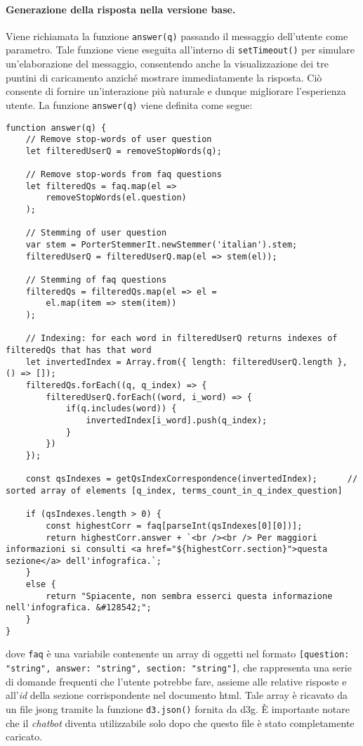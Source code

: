 \paragraph{Generazione della risposta nella versione base.} Viene richiamata la funzione \texttt{answer(q)} passando il messaggio dell'utente come parametro. Tale funzione viene eseguita all'interno di \texttt{setTimeout()} per simulare un'elaborazione 
del messaggio, consentendo anche la visualizzazione dei tre puntini di caricamento anziché mostrare immediatamente la risposta. Ciò consente di fornire un'interazione più naturale e dunque migliorare l'esperienza utente.
La funzione \texttt{answer(q)} viene definita come segue:
\begin{lstlisting}[style=htmlcssjs]
function answer(q) {   
    // Remove stop-words of user question
    let filteredUserQ = removeStopWords(q);

    // Remove stop-words from faq questions
    let filteredQs = faq.map(el => 
        removeStopWords(el.question)
    );

    // Stemming of user question
    var stem = PorterStemmerIt.newStemmer('italian').stem;
    filteredUserQ = filteredUserQ.map(el => stem(el));

    // Stemming of faq questions
    filteredQs = filteredQs.map(el => el =
        el.map(item => stem(item))
    );

    // Indexing: for each word in filteredUserQ returns indexes of filteredQs that has that word
    let invertedIndex = Array.from({ length: filteredUserQ.length }, () => []);
    filteredQs.forEach((q, q_index) => {
        filteredUserQ.forEach((word, i_word) => {
            if(q.includes(word)) {
                invertedIndex[i_word].push(q_index);
            }
        })
    });

    const qsIndexes = getQsIndexCorrespondence(invertedIndex);      // sorted array of elements [q_index, terms_count_in_q_index_question]

    if (qsIndexes.length > 0) {
        const highestCorr = faq[parseInt(qsIndexes[0][0])];
        return highestCorr.answer + `<br /><br /> Per maggiori informazioni si consulti <a href="${highestCorr.section}">questa sezione</a> dell'infografica.`;
    }
    else {
        return "Spiacente, non sembra esserci questa informazione nell'infografica. &#128542;";
    }
}
\end{lstlisting}
dove \texttt{faq} è una variabile contenente un array di oggetti nel formato \texttt{[{question: "string", answer: "string", section: "string"}]}, che rappresenta una serie di domande frequenti che l'utente potrebbe fare, 
assieme alle relative risposte e all'\emph{id} della sezione corrispondente nel documento \gls{html}. Tale array è ricavato da un file \gls{jsong} tramite la funzione \texttt{d3.json()} fornita da \gls{d3g}. 
È importante notare che il \emph{chatbot} diventa utilizzabile solo dopo che questo file è stato completamente caricato.

